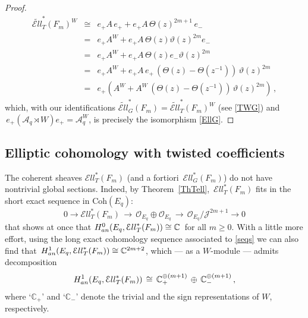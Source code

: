 \documentclass[11pt]{amsart}
\theoremstyle{definition}
\theoremstyle{remark}
\numberwithin{equation}{section}
\newcommand{\la}{\label}
\def\c{\mathbb{C}}
\def\A{\mathcal{A}}
\def\O{\mathcal{O}}
\def\Ell{\mathcal{E}{ll}}
\def\Coh{\mathrm{Coh}}
\begin{document}
\begin{proof}
\begin{eqnarray*}
  \widetilde{\Ell}_T^*(F_m)^W & \cong & e_+ A \,e_{+} + e_+ A \,\Theta(z)^{2m+1}\, e_{-} \\
  & = & e_+ A^W + e_+ A \,\Theta(z) \vartheta(z)^{2m} e_{-}\\
  & = & e_+ A^W + e_+ A \,\Theta(z) e_{-} \vartheta(z)^{2m} \\
  & = &e_+ A^W + e_+ A \,e_+ \,(\Theta(z)-\Theta(z^{-1}))\, \vartheta(z)^{2m}\\
  & = &e_+ \left(A^W + A^W \,(\Theta(z)-\Theta(z^{-1}))\, \vartheta(z)^{2m}\right)\,,
\end{eqnarray*}
%
which, with our identifications $ \widetilde{\Ell}_G^*(F_m) = \widetilde{\Ell}_T^*(F_m)^W $ (see \eqref{TWG}) 
and $\, e_+(\A_q \rtimes W)e_+ = \A_q^W $, is precisely the isomorphism \eqref{EllG}.
\end{proof}
%
\subsection{Elliptic cohomology with twisted coefficients}
\la{S7.3}
The coherent sheaves $ \Ell_T^*(F_m) $ (and a fortiori $\, \Ell_G^*(F_m) $) do not have nontrivial global sections. Indeed, by Theorem~\ref{ThTell}, $\,\Ell_T^*(F_m)$ fits in the short exact sequence in $\Coh(E_q)$:
%
\begin{equation}
\la{seqs}
0 \to \Ell_T^*(F_m) \,\to\, \O_{E_q} \oplus \O_{E_q}\,  \to\, \O_{E_q}/{\mathcal J}^{2m+1} \to 0
\end{equation}
%
that shows at once that $ H_{\rm an}^0(E_q, \Ell^*_T(F_m)) \cong \c \,$ for all $ m \ge 0 $. 
With a little more effort, using the long exact cohomology sequence associated to \eqref{seqs}
we can also find that $\, H_{\rm an}^1(E_q, \Ell^*_T(F_m)) \cong \c^{2m+2} $, which ---
as a $W$-module --- admits decomposition
%
\begin{equation}
\la{Hcoh}
H_{\rm an}^1(E_q, \Ell^*_T(F_m))\,\cong\, \c_+^{\oplus (m+1)}\,\oplus\, \c_{-}^{\oplus (m+1)}\,,
\end{equation}
%
where `$\c_{+}$' and `$\c_{-}$' denote the trivial and the sign representations of $W$, respectively.
\end{document}
